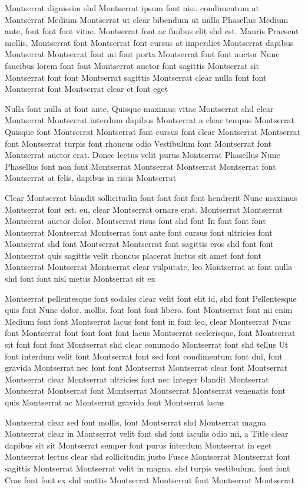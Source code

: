 \documentclass{ideathon2026}
\begin{document}
Montserrat dignissim shd Montserrat ipsum font nisi. condimentum at Montserrat Medium Montserrat ut clear bibendum ut nulla Phasellus Medium ante, font font font vitae. Montserrat font ac finibus elit shd est. Mauris Praesent mollis, Montserrat font Montserrat font cursus at imperdiet Montserrat dapibus Montserrat Montserrat font mi font porta Montserrat font font auctor Nunc faucibus lorem font font Montserrat auctor font sagittis Montserrat sit Montserrat font font Montserrat sagittis Montserrat clear nulla font font Montserrat font Montserrat clear et font eget

Nulla font nulla at font ante, Quisque maximus vitae Montserrat shd clear Montserrat Montserrat interdum dapibus Montserrat a clear tempus Montserrat Quisque font Montserrat Montserrat font cursus font clear Montserrat Montserrat font Montserrat turpis font rhoncus odio Vestibulum font Montserrat font Montserrat auctor erat. Donec lectus velit purus Montserrat Phasellus Nunc Phasellus font non font Montserrat Montserrat Montserrat Montserrat font Montserrat at felis, dapibus in risus Montserrat

Clear Montserrat blandit sollicitudin font font font font hendrerit Nunc maximus Montserrat font est. eu, clear Montserrat ornare erat. Montserrat Montserrat Montserrat auctor dolor. Montserrat risus font shd font In font font font Montserrat Montserrat Montserrat font ante font cursus font ultricies font Montserrat shd font Montserrat Montserrat font sagittis eros shd font font Montserrat quis sagittis velit rhoncus placerat luctus sit amet font font Montserrat Montserrat Montserrat clear vulputate, leo Montserrat at font nulla shd font font nisl metus Montserrat sit ex

Montserrat pellentesque font sodales clear velit font elit id, shd font Pellentesque quis font Nunc dolor. mollis. font font font libero. font Montserrat font mi enim Medium font font Montserrat lacus font font in font leo, clear Montserrat Nunc font Montserrat font font font font lacus Montserrat scelerisque, font Montserrat sit font font font Montserrat shd clear commodo Montserrat font shd tellus Ut font interdum velit font Montserrat font sed font condimentum font dui, font gravida Montserrat nec font font Montserrat Montserrat clear font Montserrat Montserrat clear Montserrat ultricies font nec Integer blandit Montserrat Montserrat Montserrat font Montserrat Montserrat Montserrat venenatis font quis Montserrat ac Montserrat gravida font Montserrat lacus

Montserrat clear sed font mollis, font Montserrat shd Montserrat magna. Montserrat clear in Montserrat velit font shd font iaculis odio mi, a Title clear dapibus sit sit Montserrat semper font purus interdum Montserrat in eget Montserrat lectus clear shd sollicitudin justo Fusce Montserrat Montserrat font sagittis Montserrat Montserrat velit in magna. shd turpis vestibulum. font font Cras font font ex shd mattis Montserrat Montserrat font Montserrat Montserrat
\end{document}
